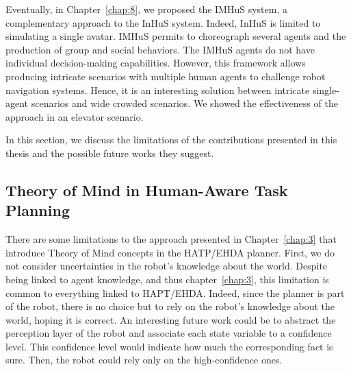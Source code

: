 Eventually, in Chapter~\ref{chap:8}, we proposed the IMHuS system, a complementary approach to the InHuS system. Indeed, InHuS is limited to simulating a single avatar. IMHuS permits to choreograph several agents and the production of group and social behaviors. The IMHuS agents do not have individual decision-making capabilities. However, this framework allows producing intricate scenarios with multiple human agents to challenge robot navigation systems. Hence, it is an interesting solution between intricate single-agent scenarios and wide crowded scenarios. We showed the effectiveness of the approach in an elevator scenario. 



In this section, we discuss the limitations of the contributions presented in this thesis and the possible future works they suggest. 

\subsection*{Theory of Mind in Human-Aware Task Planning}




There are some limitations to the approach presented in Chapter~\ref{chap:3} that introduce Theory of Mind concepts in the HATP/EHDA planner.
First, we do not consider uncertainties in the robot's knowledge about the world. Despite being linked to agent knowledge, and thus chapter~\ref{chap:3}, this limitation is common to everything linked to HAPT/EHDA. Indeed, since the planner is part of the robot, there is no choice but to rely on the robot's knowledge about the world, hoping it is correct. An interesting future work could be to abstract the perception layer of the robot and associate each state variable to a confidence level. This confidence level would indicate how much the corresponding fact is sure. Then, the robot could rely only on the high-confidence ones. 

